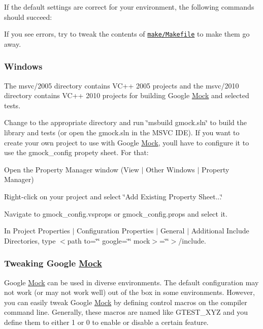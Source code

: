 If the default settings are correct for your environment, the following commands should succeed\+: 


If you see errors, try to tweak the contents of \href{make/Makefile}{\tt make/\+Makefile} to make them go away.

\subsubsection*{Windows}

The msvc/2005 directory contains V\+C++ 2005 projects and the msvc/2010 directory contains V\+C++ 2010 projects for building Google \hyperlink{class_mock}{Mock} and selected tests.

Change to the appropriate directory and run \char`\"{}msbuild gmock.\+sln\char`\"{} to build the library and tests (or open the gmock.\+sln in the M\+S\+VC I\+DE). If you want to create your own project to use with Google \hyperlink{class_mock}{Mock}, you\textquotesingle{}ll have to configure it to use the {\ttfamily gmock\+\_\+config} propety sheet. For that\+:


\begin{DoxyItemize}
\item Open the Property Manager window (View $\vert$ Other Windows $\vert$ Property Manager)
\item Right-\/click on your project and select \char`\"{}\+Add Existing Property Sheet...\char`\"{}
\item Navigate to {\ttfamily gmock\+\_\+config.\+vsprops} or {\ttfamily gmock\+\_\+config.\+props} and select it.
\item In Project Properties $\vert$ Configuration Properties $\vert$ General $\vert$ Additional Include Directories, type $<$path to=\char`\"{}\char`\"{} google=\char`\"{}\char`\"{} mock$>$=\char`\"{}\char`\"{}$>$/include.
\end{DoxyItemize}

\subsubsection*{Tweaking Google \hyperlink{class_mock}{Mock}}

Google \hyperlink{class_mock}{Mock} can be used in diverse environments. The default configuration may not work (or may not work well) out of the box in some environments. However, you can easily tweak Google \hyperlink{class_mock}{Mock} by defining control macros on the compiler command line. Generally, these macros are named like {\ttfamily G\+T\+E\+S\+T\+\_\+\+X\+YZ} and you define them to either 1 or 0 to enable or disable a certain feature.

